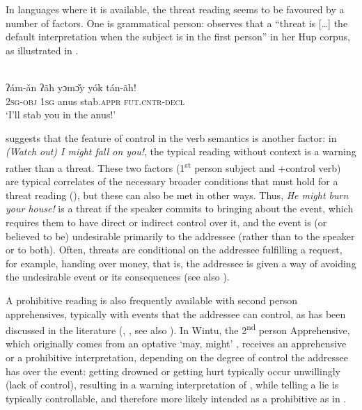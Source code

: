 \documentclass[output=paper,colorlinks,citecolor=brown
]{langscibook}
\begin{document}
In languages where it is available, the threat reading seems to be favoured by a number of factors. One is grammatical person: \citet[631]{epps2008} observes that a ``threat is [\ldots] the default interpretation when the subject is in the first person'' in her Hup corpus, as illustrated in .

\ea \label{ex:intro22}
\\
\gll ʔám-ǎn ʔãh yɔmɔ̌y yók tán-ãh! \\
\textsc{2sg-obj} \textsc{1sg} anus stab.\textsc{appr} \textsc{fut.cntr-decl} \\
\glt `I'll stab you in the anus!' 
\z


\citet[273--4]{vuillermet2018a} suggests that the feature of control in the verb semantics is another factor: in \textit{(Watch out) I might fall on you!}, the typical reading without context is a warning rather than a threat. These two factors (1\textsuperscript{st} person subject and $+$control verb) are typical correlates of the necessary broader conditions that must hold for a threat reading (\cite{searle-taxonomy,salgueiro2010}), but these can also be met in other ways. Thus, \textit{He might burn your house!} is a threat if the speaker commits to bringing about the event, which requires them to have direct or indirect control over it, and the event is (or believed to be) undesirable primarily to the addressee (rather than to the speaker or to both). Often, threats are conditional on the addressee fulfilling a request, for example, handing over money, that is, the addressee is given a way of avoiding the undesirable event or its consequences (see also \citealt{chapters/fedotov}).

A prohibitive reading is also frequently available with second person apprehensives, typically with events that the addressee can control, as has been discussed in the literature (\cite[57]{Dobrushina2006}, \cite{pakendorfschalley2007}, see also \citealt{chapters/wiemer}). In Wintu, the 2\textsuperscript{nd} person Apprehensive, which originally comes from an optative `may, might' \citep[193]{pitkin1984}, receives an apprehensive or a prohibitive interpretation, depending on the degree of control the addressee has over the event: getting drowned or getting hurt typically occur unwillingly (lack of control), resulting in a warning interpretation of , while telling a lie is typically controllable, and therefore more likely intended as a prohibitive as in .
\end{document}
